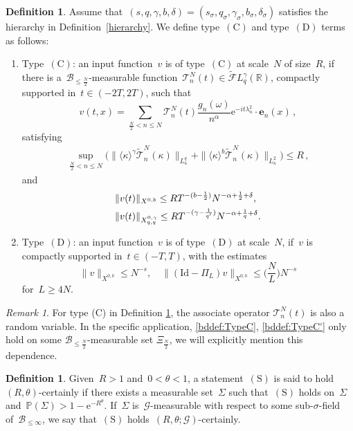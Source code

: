 \documentclass[11pt,reqno,english]{amsart}
\numberwithin{equation}{section}
\theoremstyle{plain}
\theoremstyle{definition}
\newtheorem{definition}[theorem]{Definition}
\theoremstyle{remark}
\newtheorem{remark}[theorem]{Remark}
\newcommand{\R}{\mathbb{R}}
\newcommand{\la}{\langle}
\newcommand{\ra}{\rangle}
\newcommand{\e}{\mathrm{e}}
\begin{document}
\begin{definition}\label{def:CD}
	Assume that~$(s,q,\gamma,b,\delta)=(s_{\sigma},q_{\sigma},\gamma_{\sigma},b_{\sigma},\delta_{\sigma})$ satisfies the hierarchy in Definition~\ref{hierarchy}.
	We define type~$\mathrm{(C)}$ and type~$\mathrm{(D)}$ terms as follows:
	\begin{enumerate}
		\item Type~$\mathrm{(C)}$: an input function~$v$ is of type~$\mathrm{(C)}$ at scale~$N$ of size~$R$, if there is a~$\mathcal{B}_{\leq \frac{N}{2}}$-measurable function~$\mathcal{T}_n^N(t)\in\widetilde{\mathcal{F}}L_q^{\gamma}(\R)$, compactly supported in~$t\in(-2T,2T)$, such that
		\[
		v(t,x) = \sum_{\frac{N}{2}<n\leq N}
		\mathcal{T}^N_{n}(t)\frac{g_{n}(\omega)}{n^{\alpha}}\e^{-it\lambda_{n}^{2}}\cdot\mathbf{e}_{n}(x)\,,
		\]
		satisfying
		\begin{align}\label{bddef:TypeC}
		\sup_{\frac{N}{2}<n\leq N}\big(\|\langle\kappa\rangle^{\gamma}\widetilde{\mathcal{T}}^N_{n}(\kappa)\|_{L_{\kappa}^{q}} + \|\la\kappa\ra^b\widetilde{\mathcal{T}}^N_n(\kappa) \|_{L_{\kappa}^2}\big)
		\leq R  \,,
		\end{align}
		and
		\begin{align}\label{bddef:TypeC'}
		&\|v(t)\|_{X^{0,b}}\leq RT^{-(b-\frac{1}{2})}N^{-\alpha+\frac{1}{2}+\delta}, \notag \\ &\|v(t)\|_{X_{q,q}^{0,\gamma}}\leq RT^{-(\gamma-\frac{1}{q'})}N^{-\alpha+\frac{1}{q}+\delta}.
		\end{align}
		\item Type~$\mathrm{(D)}$: an input function~$v$ is of type~$\mathrm{(D)}$ at scale~$N$, if~$v$ is compactly supported in~$t\in(-T,T)$, with the estimates
		\[
		\|v\|_{X^{0,b}}
		\leq N^{-s},\quad \|(\mathrm{Id}-\Pi_L)v\|_{X^{0,b}}\leq  \big(\frac{N}{L}\big)N^{-s}
		\]
		for~$L\geq 4N$.
	\end{enumerate}
\end{definition}

\begin{remark}
For type (C) in Definition \ref{def:CD}, the associate operator $\mathcal{T}_n^N(t)$ is also a random variable. In the specific application,  \eqref{bddef:TypeC}, \eqref{bddef:TypeC'} only hold on some $\mathcal{B}_{\leq \frac{N}{2}}$-measurable set $\Xi_{\frac{N}{2}}$, we will explicitly mention this dependence. 
\end{remark}

\begin{definition}\label{R-certainly}
	Given~$R>1$ and~$0<\theta<1$, a statement~$\mathrm{(S)}$ is said to hold~$(R,\theta)$-certainly if there exists a measurable set~$\Sigma$ such that~$\mathrm{(S)}$ holds on~$\Sigma$ and~$\mathbb{P}(\Sigma)>1-\e^{-R^{\theta}}$. If~$\Sigma$ is~$\mathcal{G}$-measurable with respect to some sub-$\sigma$-field of~$\mathcal{B}_{\leq \infty}$, we say that~$\mathrm{(S)}$ holds~$(R,\theta;\mathcal{G})$-certainly.
\end{definition}
\end{document}
